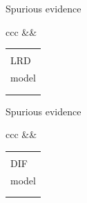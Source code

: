 \documentclass[xcolor=table]{beamer}
\begin{document}
\begin{frame}{Spurious evidence}
\begin{tabular}{ccc}
&&
\begin{tabular}{l}
\\
\\
LRD\\ 
model\\
\\
\\
\end{tabular}
\end{tabular}
\end{frame}

\begin{frame}{Spurious evidence}
\begin{tabular}{ccc}
&&
\begin{tabular}{l}
\\
\\
DIF \\
model \\
\\
\\
\end{tabular}
\end{tabular}
\end{frame}
\end{document}
